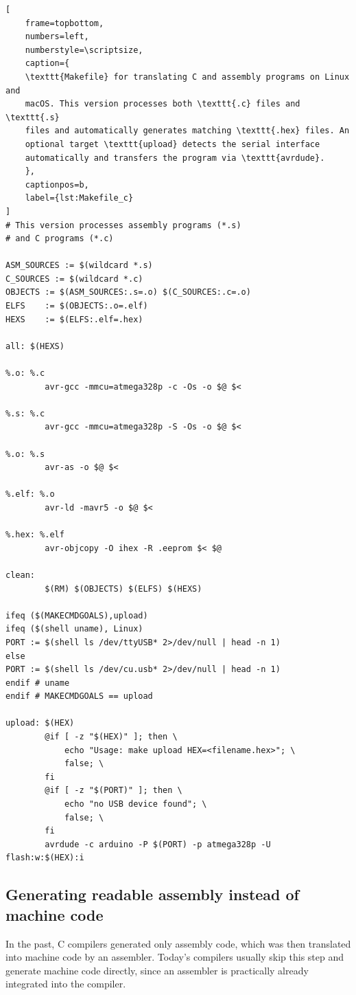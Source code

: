 \documentclass[a4paper,12pt]{article}
\begin{document}
\begin{listing}[htbp]
\begin{lstlisting}[
    frame=topbottom,
    numbers=left,
    numberstyle=\scriptsize,
    caption={
	\texttt{Makefile} for translating C and assembly programs on Linux and
	macOS. This version processes both \texttt{.c} files and \texttt{.s}
	files and automatically generates matching \texttt{.hex} files. An
	optional target \texttt{upload} detects the serial interface
	automatically and transfers the program via \texttt{avrdude}.
    },
    captionpos=b,
    label={lst:Makefile_c}
]
# This version processes assembly programs (*.s)
# and C programs (*.c)

ASM_SOURCES := $(wildcard *.s)
C_SOURCES := $(wildcard *.c)
OBJECTS := $(ASM_SOURCES:.s=.o) $(C_SOURCES:.c=.o)
ELFS    := $(OBJECTS:.o=.elf)
HEXS    := $(ELFS:.elf=.hex)

all: $(HEXS)

%.o: %.c
        avr-gcc -mmcu=atmega328p -c -Os -o $@ $<

%.s: %.c
        avr-gcc -mmcu=atmega328p -S -Os -o $@ $<

%.o: %.s
        avr-as -o $@ $<

%.elf: %.o
        avr-ld -mavr5 -o $@ $<

%.hex: %.elf
        avr-objcopy -O ihex -R .eeprom $< $@

clean:
        $(RM) $(OBJECTS) $(ELFS) $(HEXS)

ifeq ($(MAKECMDGOALS),upload)
ifeq ($(shell uname), Linux)
PORT := $(shell ls /dev/ttyUSB* 2>/dev/null | head -n 1)
else
PORT := $(shell ls /dev/cu.usb* 2>/dev/null | head -n 1)
endif # uname
endif # MAKECMDGOALS == upload

upload: $(HEX)
        @if [ -z "$(HEX)" ]; then \
            echo "Usage: make upload HEX=<filename.hex>"; \
            false; \
        fi
        @if [ -z "$(PORT)" ]; then \
            echo "no USB device found"; \
            false; \
        fi
        avrdude -c arduino -P $(PORT) -p atmega328p -U flash:w:$(HEX):i
\end{lstlisting}
\end{listing}

\subsection{Generating readable assembly instead of machine code}

In the past, C compilers generated only assembly code, which was then
translated into machine code by an assembler. Today's compilers usually skip
this step and generate machine code directly, since an assembler is
practically already integrated into the compiler.
\end{document}
